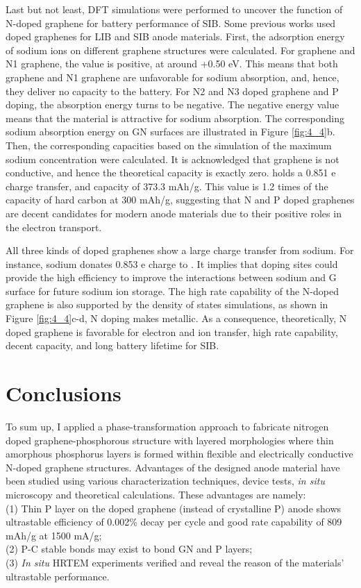 Last but not least, DFT simulations were performed to uncover the function of N-doped graphene for battery performance of SIB. 
Some previous works used doped graphenes for LIB and SIB anode materials.\cite{Yang2011c,Wen2014b,Wang2013h,Wang2012e,Wang2014f} 
First, the adsorption energy of sodium ions on different graphene structures were calculated. 
For graphene and N1 graphene, the value is positive, at around +0.50 eV. 
This means that both graphene and N1 graphene are unfavorable for sodium absorption, and, hence, they deliver no capacity to the battery. 
For N2 and N3 doped graphene and P doping, the absorption energy turns to be negative. 
The negative energy value means that the material is attractive for sodium absorption. 
The corresponding sodium absorption energy on GN surfaces are illustrated in Figure \ref{fig:4_4}b. 
Then, the corresponding capacities based on the simulation of the maximum sodium concentration were calculated. 
It is acknowledged that graphene is not conductive, and hence the theoretical capacity is exactly zero.
 holds a 0.851 e charge transfer, and capacity of 373.3 mAh/g. This value is 1.2 times of the capacity of hard carbon at 300 mAh/g, suggesting that N and P doped graphenes are decent candidates for modern anode materials due to their positive roles in the electron transport. 

All three kinds of doped graphenes show a large charge transfer from sodium.
For instance, sodium donates 0.853 e charge to . 
It implies that doping sites could provide the high efficiency to improve the interactions between sodium and G surface for future sodium ion storage. 
The high rate capability of the N-doped graphene is also supported by the density of states simulations, as shown in Figure \ref{fig:4_4}c-d, N doping makes  metallic. 
As a consequence, theoretically, N doped graphene is favorable for electron and ion transfer, high rate capability, decent capacity, and long battery lifetime for SIB.

\section{Conclusions}
To sum up, I applied a phase-transformation approach to fabricate nitrogen doped graphene-phosphorous structure with layered morphologies where thin amorphous phosphorus layers is formed within flexible and electrically conductive N-doped graphene structures. 
Advantages of the designed anode material have been studied using various characterization techniques, device tests, {\em in situ} microscopy and theoretical calculations. 
These advantages are namely: \\
(1) Thin P layer on the doped graphene (instead of crystalline P) anode shows ultrastable efficiency of 0.002\% decay per cycle and good rate capability of 809 mAh/g at 1500 mA/g; \\
(2) P-C stable bonds may exist to bond GN and P layers; \\
(3) {\em In situ} HRTEM experiments verified and reveal the reason of the materials' ultrastable performance.\\

